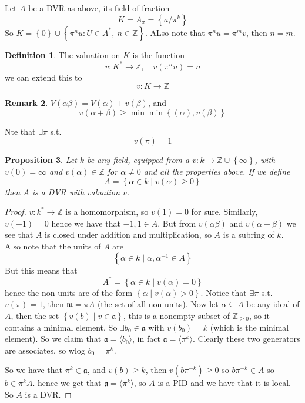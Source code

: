 \documentclass[11pt,a4paper]{article}
\theoremstyle{definition}
\newtheorem{definition}{Definition}[section]
\newtheorem{remark}[definition]{Remark}
\theoremstyle{plain}
\newtheorem{proposition}[definition]{Proposition}
\theoremstyle{remark}
\newcommand{\Z}{\mathbb{Z}}
\renewcommand{\set}[1]{\left\{ #1 \right\}}
\newcommand{\angles}[1]{\langle #1 \rangle}
\begin{document}
Let $A$ be a DVR as above, its field of fraction 
$$K = A_\pi = \set{a/\pi^k}$$ 
So $K = \set{0} \cup \set{\pi^n u \colon U \in A^*, \ n \in \Z}$. 
ALso note that $\pi^n u = \pi^m v$, then $n = m$.

\begin{definition}
    The valuation on $K$ is the function 
    $$v \colon K^* \to \Z, \quad v(\pi^n u)= n$$
    we can extend this to 
    $$v \colon K \to \Z$$
\end{definition}

\begin{remark}
    $V(\alpha \beta) = V(\alpha) + v(\beta)$, and 
    $$v(\alpha + \beta) \ge \min \min \set{(\alpha), v(\beta)}$$

    Nte that $\exists \pi$ s.t. 
    $$v(\pi) = 1$$
\end{remark}

\begin{proposition}
    Let $k$ be any field, equipped from a $v \colon k \to \Z \cup \set{\infty}$, with 
    $v(0) = \infty$ and $v(\alpha) \in \Z$ for $\alpha \ne 0$ and all the properties above. 
    If we define 
    $$A = \set{\alpha \in k \mid v(\alpha) \ge 0}$$
    then $A$ is a DVR with valuation $v$. 
\end{proposition}

\begin{proof}
    $v \colon k^* \to \Z$ is a homomorphism, so $v(1) = 0$ for sure. Similarly, $v(-1) = 0$ hence we have that 
    $-1, 1 \in A$. But from $v(\alpha \beta)$ and $v(\alpha + \beta)$ we see that $A$ is closed under addition and multiplication, 
    so $A$ is a subring of $k$. Also note that the units of $A$ are 
    $$\set{\alpha \in k \mid \alpha, \alpha^{-1} \in A}$$
    But this means that 
    $$A^* = \set{\alpha \in k \mid v(\alpha) = 0}$$
    hence the non units are of the form $\set{\alpha \mid v(\alpha) > 0}$. Notice that $\exists \pi$ s.t. 
    $v(\pi) = 1$, then $\mathfrak{m} = \pi A$ (the set of all non-units). Now let $\alpha \subseteq A$ be any ideal 
    of $A$, then the set $\set{v(b) \mid v \in \mathfrak{a}}$, this is a nonempty subset of $\Z_{\ge 0}$, so it contains a minimal element. 
    So $\exists b_0 \in \mathfrak{a}$ with $v(b_0) = k$ (which is the minimal element). So we claim that $\mathfrak{a} = \angles{b_0}$, 
    in fact $\mathfrak{a} = \angles{\pi^k}$. Clearly these two generators are associates, so wlog $b_0 = \pi^k$. 

    So we have that $\pi^k \in \mathfrak{a}$, and $v(b) \ge k$, then $v(b\pi^{-k}) \ge 0$ so $b \pi^{-k} \in A$ so $b \in \pi^k A$. 
    hence we get that $\mathfrak{a} = \angles{\pi^k}$, so $A$ is a PID and we have that it is local. So $A$ is a DVR. 
\end{proof}
\end{document}
